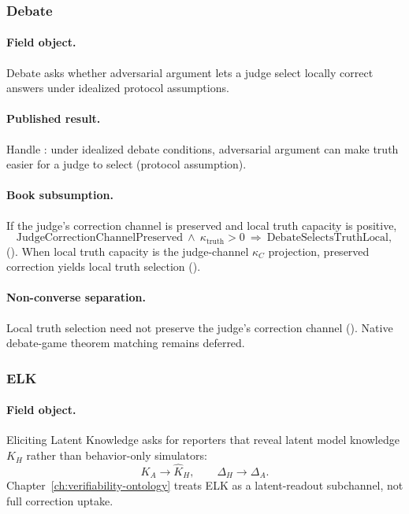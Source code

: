 \subsubsection{Debate \autocite{irving2018debate}}
\label{sec:appi-field-debate}

\paragraph{Field object.}
Debate asks whether adversarial argument lets a judge select locally correct answers under idealized protocol assumptions.

\paragraph{Published result.}
Handle : under idealized debate conditions, adversarial argument can make truth easier for a judge to select \autocite{irving2018debate} (protocol assumption).

\paragraph{Book subsumption.}
If the judge's correction channel is preserved and local truth capacity is positive,
\begin{equation}
\label{appi:eq:debate-subsumption}
\mathrm{JudgeCorrectionChannelPreserved}\ \wedge\ \kappa_{\mathrm{truth}}>0
\ \Rightarrow\ \mathrm{DebateSelectsTruthLocal},
\end{equation}
().
When local truth capacity is the judge-channel \(\kappa_C\) projection, preserved correction yields local truth selection ().

\paragraph{Non-converse separation.}
Local truth selection need not preserve the judge's correction channel ().
Native debate-game theorem matching remains deferred.

\subsubsection{ELK \autocite{christiano2021elk}}
\label{sec:appi-field-elk}

\paragraph{Field object.}
Eliciting Latent Knowledge asks for reporters that reveal latent model knowledge \(K_H\) rather than behavior-only simulators:
\begin{equation}
\label{appi:eq:field-elk-readout}
K_A\to \widehat K_H,
\qquad
\Delta_H\to \Delta_A.
\end{equation}
Chapter~\ref{ch:verifiability-ontology} treats ELK as a latent-readout subchannel, not full correction uptake.

